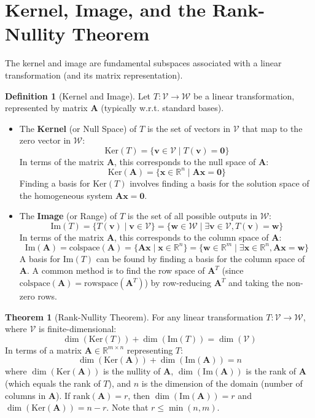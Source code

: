 \documentclass[12pt, letterpaper]{article}
\theoremstyle{definition}
\newtheorem{definition}{Definition}[section]
\newtheorem{theorem}{Theorem}[section]
\newcommand{\R}{\mathbb{R}}
\newcommand{\V}{\mathcal{V}}
\newcommand{\W}{\mathcal{W}}
\newcommand{\mat}[1]{\mathbf{#1}} %
\newcommand{\vect}[1]{\mathbf{#1}} %
\renewcommand{\v}{\vect{v}} %
\newcommand{\x}{\vect{x}} %
\newcommand{\w}{\vect{w}} %
\newcommand{\colspace}{\text{colspace}}
\newcommand{\im}{\text{Im}}
\newcommand{\Ker}{\text{Ker}}
\newcommand{\rank}{\text{rank}}
\begin{document}
\section{Kernel, Image, and the Rank-Nullity Theorem}

The kernel and image are fundamental subspaces associated with a linear transformation (and its matrix representation).

\begin{definition}[Kernel and Image]
Let $T: \V \to \W$ be a linear transformation, represented by matrix $\mat{A}$ (typically w.r.t. standard bases).
\begin{itemize}
    \item The \textbf{Kernel} (or Null Space) of $T$ is the set of vectors in $\V$ that map to the zero vector in $\W$:
    \[ \Ker(T) = \{\v \in \V \mid T(\v) = \vect{0}\} \]
    In terms of the matrix $\mat{A}$, this corresponds to the null space of $\mat{A}$:
    \[ \Ker(\mat{A}) = \{\x \in \R^n \mid \mat{A}\x = \vect{0}\} \]
    Finding a basis for $\Ker(T)$ involves finding a basis for the solution space of the homogeneous system $\mat{A}\x = \vect{0}$.
    
    \item The \textbf{Image} (or Range) of $T$ is the set of all possible outputs in $\W$:
    \[ \im(T) = \{T(\v) \mid \v \in \V\} = \{\w \in \W \mid \exists \v \in \V, T(\v) = \w\} \]
    In terms of the matrix $\mat{A}$, this corresponds to the column space of $\mat{A}$:
    \[ \im(\mat{A}) = \colspace(\mat{A}) = \{\mat{A}\x \mid \x \in \R^n\} = \{\w \in \R^m \mid \exists \x \in \R^n, \mat{A}\x = \w\} \]
    A basis for $\im(T)$ can be found by finding a basis for the column space of $\mat{A}$. A common method is to find the row space of $\mat{A}^T$ (since $\colspace(\mat{A}) = \text{rowspace}(\mat{A}^T)$) by row-reducing $\mat{A}^T$ and taking the non-zero rows.
\end{itemize}
\end{definition}

\begin{theorem}[Rank-Nullity Theorem]
For any linear transformation $T: \V \to \W$, where $\V$ is finite-dimensional:
\[ \dim(\Ker(T)) + \dim(\im(T)) = \dim(\V) \]
In terms of a matrix $\mat{A} \in \R^{m \times n}$ representing $T$:
\[ \dim(\Ker(\mat{A})) + \dim(\im(\mat{A})) = n \]
where $\dim(\Ker(\mat{A}))$ is the nullity of $\mat{A}$, $\dim(\im(\mat{A}))$ is the rank of $\mat{A}$ (which equals the rank of $T$), and $n$ is the dimension of the domain (number of columns in $\mat{A}$).
If $\rank(\mat{A}) = r$, then $\dim(\im(\mat{A})) = r$ and $\dim(\Ker(\mat{A})) = n - r$. Note that $r \le \min(n, m)$.
\end{theorem}
\end{document}
